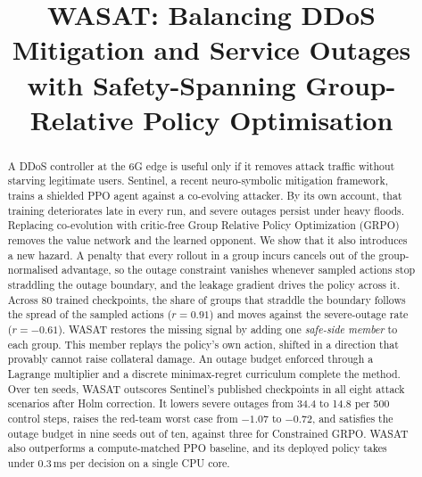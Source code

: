 \documentclass[conference]{IEEEtran}
\begin{document}
\title{WASAT: Balancing DDoS Mitigation and Service Outages with Safety-Spanning Group-Relative Policy Optimisation}

\author{
}

\maketitle

\begin{abstract}
A DDoS controller at the 6G edge is useful only if it removes attack traffic without starving legitimate users. Sentinel, a recent neuro-symbolic mitigation framework, trains a shielded PPO agent against a co-evolving attacker. By its own account, that training deteriorates late in every run, and severe outages persist under heavy floods. Replacing co-evolution with critic-free Group Relative Policy Optimization (GRPO) removes the value network and the learned opponent. We show that it also introduces a new hazard. A penalty that every rollout in a group incurs cancels out of the group-normalised advantage, so the outage constraint vanishes whenever sampled actions stop straddling the outage boundary, and the leakage gradient drives the policy across it. Across 80 trained checkpoints, the share of groups that straddle the boundary follows the spread of the sampled actions ($r=0.91$) and moves against the severe-outage rate ($r=-0.61$). WASAT restores the missing signal by adding one \emph{safe-side member} to each group. This member replays the policy's own action, shifted in a direction that provably cannot raise collateral damage. An outage budget enforced through a Lagrange multiplier and a discrete minimax-regret curriculum complete the method. Over ten seeds, WASAT outscores Sentinel's published checkpoints in all eight attack scenarios after Holm correction. It lowers severe outages from 34.4 to 14.8 per 500 control steps, raises the red-team worst case from $-1.07$ to $-0.72$, and satisfies the outage budget in nine seeds out of ten, against three for Constrained GRPO. WASAT also outperforms a compute-matched PPO baseline, and its deployed policy takes under 0.3\,ms per decision on a single CPU core.
\end{abstract}
\end{document}
